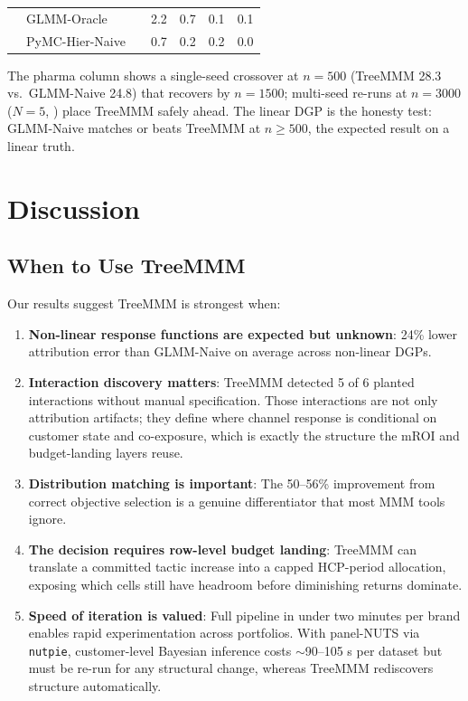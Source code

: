 \documentclass[review,12pt]{elsarticle}
\begin{document}
\begin{table}[p]
{\begin{tabular}{@{}lllrrrr@{}}
  & GLMM-Oracle        & & 2.2 & 0.7 & 0.1 & 0.1  \\
  & PyMC-Hier-Naive    & & 0.7 & 0.2 & 0.2 & 0.0  \\
\bottomrule
\end{tabular}
\par}
\medskip
\begin{minipage}{\linewidth}
\footnotesize\itshape\raggedright
The pharma column shows a single-seed crossover at $n{=}500$
(TreeMMM 28.3 vs.\ GLMM-Naive 24.8) that recovers by $n{=}1500$; multi-seed
re-runs at $n{=}3000$ ($N{=}5$, ) place TreeMMM safely
ahead. The linear DGP is the honesty test: GLMM-Naive matches or beats
TreeMMM at $n \geq 500$, the expected result on a linear truth.
\end{minipage}
\end{table}

\section{Discussion}
\label{sec:discussion}

\subsection{When to Use TreeMMM}
\label{sec:discussion:when}

Our results suggest TreeMMM is strongest when:
\begin{enumerate}
\item \textbf{Non-linear response functions are expected but unknown}: 24\%
  lower attribution error than GLMM-Naive on average across non-linear DGPs.
\item \textbf{Interaction discovery matters}: TreeMMM detected 5 of 6 planted
  interactions without manual specification. Those interactions are not only
  attribution artifacts; they define where channel response is conditional on
  customer state and co-exposure, which is exactly the structure the mROI and
  budget-landing layers reuse.
\item \textbf{Distribution matching is important}: The 50--56\% improvement
  from correct objective selection is a genuine differentiator that most MMM
  tools ignore.
\item \textbf{The decision requires row-level budget landing}: TreeMMM can
  translate a committed tactic increase into a capped HCP-period allocation,
  exposing which cells still have headroom before diminishing returns dominate.
\item \textbf{Speed of iteration is valued}: Full pipeline in under two minutes
  per brand enables rapid experimentation across portfolios. With panel-NUTS
  via \texttt{nutpie}, customer-level Bayesian inference costs $\sim$90--105 s
  per dataset but must be re-run for any structural change, whereas TreeMMM
  rediscovers structure automatically.
\end{enumerate}
\end{document}
